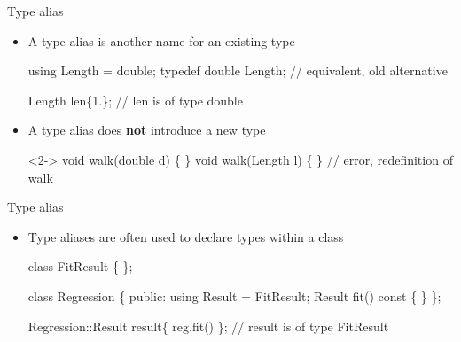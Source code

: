 \begin{frame}[fragile]{Type alias}

  \begin{itemize}
  \item A type alias is another name for an existing type

  \begin{codeblock}
using Length = double;
typedef double Length; // equivalent, old alternative

Length len\{1.\}; // len is of type double\end{codeblock}

  \item<2-> A type alias does \textbf{not} introduce a new type

    \begin{codeblock}<2->{
void walk(double d) \{ \ddd \}
void walk(Length l) \{ \ddd \} // error, redefinition of walk}\end{codeblock}

  \end{itemize}
\end{frame}

\begin{frame}[fragile]{Type alias \insertcontinuationtext}

  \begin{itemize}
  \item Type aliases are often used to declare types within a class

    \begin{codeblock}
class FitResult \{ \ddd \};

class Regression \{
  \ddd
 public:
  \alert{using Result = FitResult;}
  Result fit() const \{ \ddd \}
\};

Regression::Result result\{ reg.fit() \}; // result is of type FitResult\end{codeblock}

  \end{itemize}

\end{frame}

